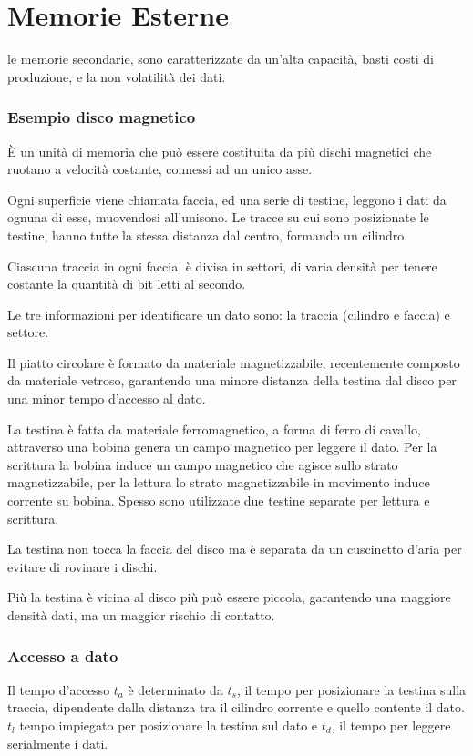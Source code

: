 \documentclass[../template]{subfiles}
\begin{document}
\section{Memorie Esterne}
le memorie secondarie, sono caratterizzate da un'alta capacità, basti costi di produzione, e la non volatilità dei dati.

\subsubsection{Esempio disco magnetico}
È un unità di memoria che può essere costituita da più dischi magnetici che ruotano a velocità costante, connessi ad un unico asse.

Ogni superficie viene chiamata faccia, ed una serie di testine, leggono i dati da ognuna di esse, muovendosi all'unisono.
Le tracce su cui sono posizionate le testine, hanno tutte la stessa distanza dal centro, formando un cilindro.

Ciascuna traccia in ogni faccia, è divisa in settori, di varia densità per tenere costante la quantità di bit letti al secondo.

Le tre informazioni per identificare un dato sono: la traccia (cilindro e faccia) e settore.

Il piatto circolare è formato da materiale magnetizzabile, recentemente composto da materiale vetroso, garantendo una minore distanza della testina dal disco per una minor tempo d'accesso al dato.

La testina è fatta da materiale ferromagnetico, a forma di ferro di cavallo, attraverso una bobina genera un campo magnetico per leggere il dato.
Per la scrittura la bobina induce un campo magnetico che agisce sullo strato magnetizzabile, per la lettura lo strato magnetizzabile in movimento induce corrente su bobina. Spesso sono utilizzate due testine separate per lettura e scrittura.

La testina non tocca la faccia del disco ma è separata da un cuscinetto d'aria per evitare di rovinare i dischi.

Più la testina è vicina al disco più può essere piccola, garantendo una maggiore densità dati, ma un maggior rischio di contatto.

\subsubsection{Accesso a dato}
Il tempo d'accesso $t_a$ è determinato da $t_s$, il tempo per posizionare la testina sulla traccia, dipendente dalla distanza tra il cilindro corrente e quello contente il dato. $t_l$ tempo impiegato per posizionare la testina sul dato e $t_d$, il tempo per leggere serialmente i dati.
\end{document}

